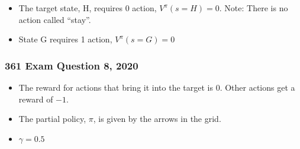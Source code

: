 \documentclass[aspectratio=169, 10pt]{beamer}
\begin{document}
\begin{frame}[t]
\begin{figure}
\begin{tikzpicture}
        \end{tikzpicture}
    \end{figure}

    \begin{itemize}
        \item The target state, H, requires 0 action, $V^\pi(s=H) = 0$. Note: There is no action called ``stay''.
        \item State G requires 1 action, $V^\pi(s=G) = 0$
    \end{itemize}
\end{frame}

\begin{frame}[t]
    \frametitle{361 Exam Question 8, 2020}
    \small

    \begin{itemize}
        \item The reward for actions that bring it into the target is $0$. Other actions get a reward of $-1$.
        \item The partial policy, $\pi$, is given by the arrows in the grid. 
        \item $\gamma = 0.5$
    \end{itemize}

    \begin{figure}
\end{figure}
\end{frame}
\end{document}
